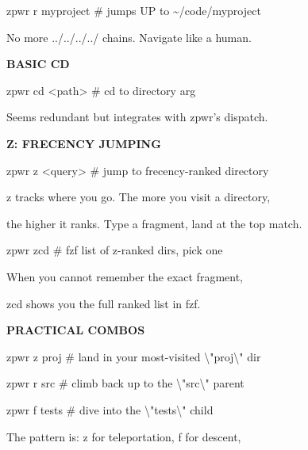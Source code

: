 \documentclass[11pt,a4paper,twoside]{book}
\begin{document}
\begin{codebox}
zpwr r myproject    \# jumps UP to \textasciitilde{}/code/myproject\\
\end{codebox}

No more ../../../../ chains. Navigate like a human.


\vspace{12pt}
{\bfseries\color{neonyellow} BASIC CD}\vspace{4pt}

\begin{codebox}
zpwr cd <path>      \# cd to directory arg\\
\end{codebox}

Seems redundant but integrates with zpwr's dispatch.


\vspace{12pt}
{\bfseries\color{neonyellow} Z: FRECENCY JUMPING}\vspace{4pt}

\begin{codebox}
zpwr z <query>      \# jump to frecency-ranked directory\\
\end{codebox}

z tracks where you go. The more you visit a directory,

the higher it ranks. Type a fragment, land at the top match.

\begin{codebox}
zpwr zcd            \# fzf list of z-ranked dirs, pick one\\
\end{codebox}

When you cannot remember the exact fragment,

zcd shows you the full ranked list in fzf.


\vspace{12pt}
{\bfseries\color{neonyellow} PRACTICAL COMBOS}\vspace{4pt}

zpwr z proj         \# land in your most-visited \textbackslash{}"proj\textbackslash{}" dir

zpwr r src          \# climb back up to the \textbackslash{}"src\textbackslash{}" parent

zpwr f tests        \# dive into the \textbackslash{}"tests\textbackslash{}" child

The pattern is: z for teleportation, f for descent,
\end{document}
